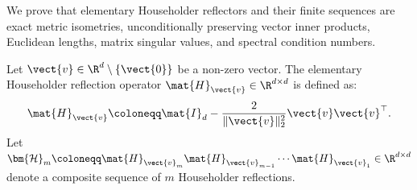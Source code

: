 We prove that elementary Householder reflectors and their finite sequences are exact metric isometries, unconditionally preserving vector inner products, Euclidean lengths, matrix singular values, and spectral condition numbers.

\begin{theorem}
\label{thm:householder_contraction}
Let $\vect{v} \in \R^d \setminus \{\vect{0}\}$ be a non-zero vector. The elementary Householder reflection operator $\mat{H}_{\vect{v}} \in \R^{d \times d}$ is defined as:
\begin{equation}
\mat{H}_{\vect{v}} \coloneqq \mat{I}_d - \frac{2}{\|\vect{v}\|_2^2} \vect{v} \vect{v}^\top.
\label{eq:householder_operator_def}
\end{equation}
Let $\bm{\mathcal{H}}_m \coloneqq \mat{H}_{\vect{v}_m} \mat{H}_{\vect{v}_{m-1}} \cdots \mat{H}_{\vect{v}_1} \in \R^{d \times d}$ denote a composite sequence of $m$ Householder reflections.


\end{theorem}
